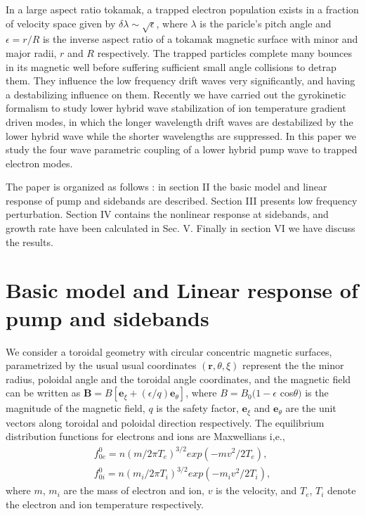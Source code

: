 \documentclass[aip,pop,amsmath,amssymb,showpacs,reprint,floatfix,lengthcheck]{revtex4-1}
\begin{document}
In a large aspect ratio tokamak, a trapped electron population exists in a fraction of velocity space given by $\delta\lambda\sim\sqrt{\epsilon}$, where $\lambda$ is the paricle's pitch angle and $\epsilon=r/R$ is the inverse aspect ratio of a tokamak magnetic surface with minor and major radii, $r$ and $R$ respectively. The trapped particles complete many bounces in its magnetic well before suffering sufficient small angle collisions to detrap them. They influence the low frequency drift waves very significantly, and having a destabilizing influence on them. Recently we \cite{kuley2009stabilization} have carried out the  gyrokinetic formalism to study lower hybrid wave stabilization of ion temperature gradient driven modes, in which the longer wavelength drift waves are destabilized by the lower hybrid wave while the shorter wavelengths are suppressed. In this paper we study the four wave parametric coupling of a lower hybrid pump wave to trapped electron modes. 

The paper is organized as follows : in section II the basic model and linear response of pump and sidebands are described. Section III presents low frequency perturbation. Section IV contains the nonlinear response at sidebands, and growth rate have been calculated in Sec. V. Finally in section VI we have discuss the results.

\section{Basic model and Linear response of pump and sidebands}
 We consider a toroidal geometry with circular concentric magnetic surfaces, parametrized by the usual usual coordinates $(\textbf{r},\theta,\xi)$ represent the the minor radius, poloidal angle and the toroidal angle coordinates, and the magnetic field can be written as $\textbf{B}=B[\textbf{e}_{\xi}+(\epsilon/q)\textbf{e}_{\theta}]$, where
$B=B_{0}(1-\epsilon$ cos$\theta)$ is the magnitude of the magnetic field, $q$ is the safety factor, $\textbf{e}_{\xi}$ and $\textbf{e}_{\theta}$ are the unit vectors along toroidal and poloidal direction respectively. The equilibrium distribution functions for electrons and ions are Maxwellians i,e.,
\begin{eqnarray}
 f_{0e}^0=n(m/2\pi T_{e})^{3/2} exp(-mv^{2}/2T_{e}),\nonumber\\
 f_{0i}^0=n(m_{i}/2\pi T_{i})^{3/2} exp(-m_{i}v^{2}/2T_{i}),
\end{eqnarray}
where $m$, $m_{i}$ are the mass of electron and ion, $v$ is the velocity, and $T_{e}$, $T_{i}$ denote the electron and ion temperature respectively.\\
\end{document}
